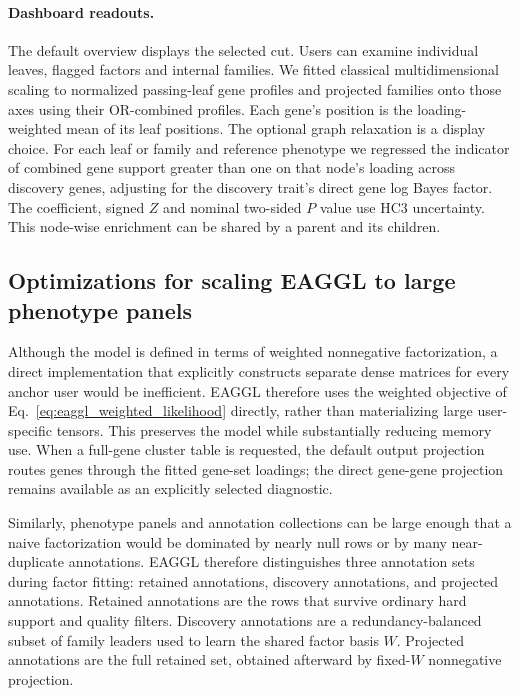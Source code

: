 \documentclass[11pt]{article}
\begin{document}
\paragraph{Dashboard readouts.}
The default overview displays the selected cut. Users can examine individual leaves, flagged factors and internal families. We fitted classical multidimensional scaling to normalized passing-leaf gene profiles and projected families onto those axes using their OR-combined profiles. Each gene's position is the loading-weighted mean of its leaf positions. The optional graph relaxation is a display choice. For each leaf or family and reference phenotype we regressed the indicator of combined gene support greater than one on that node's loading across discovery genes, adjusting for the discovery trait's direct gene log Bayes factor. The coefficient, signed $Z$ and nominal two-sided $P$ value use HC3 uncertainty. This node-wise enrichment can be shared by a parent and its children.

\subsection{Optimizations for scaling EAGGL to large phenotype panels}

Although the model is defined in terms of weighted nonnegative factorization, a direct implementation that explicitly constructs separate dense matrices for every anchor user would be inefficient. EAGGL therefore uses the weighted objective of Eq.~\eqref{eq:eaggl_weighted_likelihood} directly, rather than materializing large user-specific tensors. This preserves the model while substantially reducing memory use. When a full-gene cluster table is requested, the default output projection routes genes through the fitted gene-set loadings; the direct gene-gene projection remains available as an explicitly selected diagnostic.

Similarly, phenotype panels and annotation collections can be large enough that a naive factorization would be dominated by nearly null rows or by many near-duplicate annotations. EAGGL therefore distinguishes three annotation sets during factor fitting: retained annotations, discovery annotations, and projected annotations. Retained annotations are the rows that survive ordinary hard support and quality filters. Discovery annotations are a redundancy-balanced subset of family leaders used to learn the shared factor basis $W$. Projected annotations are the full retained set, obtained afterward by fixed-$W$ nonnegative projection.
\end{document}
